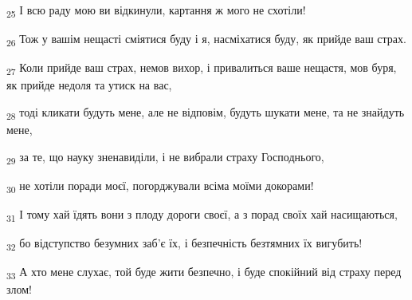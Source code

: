 \begin{tcolorbox}
\textsubscript{25} І всю раду мою ви відкинули, картання ж мого не схотіли!
\end{tcolorbox}
\begin{tcolorbox}
\textsubscript{26} Тож у вашім нещасті сміятися буду і я, насміхатися буду, як прийде ваш страх.
\end{tcolorbox}
\begin{tcolorbox}
\textsubscript{27} Коли прийде ваш страх, немов вихор, і привалиться ваше нещастя, мов буря, як прийде недоля та утиск на вас,
\end{tcolorbox}
\begin{tcolorbox}
\textsubscript{28} тоді кликати будуть мене, але не відповім, будуть шукати мене, та не знайдуть мене,
\end{tcolorbox}
\begin{tcolorbox}
\textsubscript{29} за те, що науку зненавиділи, і не вибрали страху Господнього,
\end{tcolorbox}
\begin{tcolorbox}
\textsubscript{30} не хотіли поради моєї, погорджували всіма моїми докорами!
\end{tcolorbox}
\begin{tcolorbox}
\textsubscript{31} І тому хай їдять вони з плоду дороги своєї, а з порад своїх хай насищаються,
\end{tcolorbox}
\begin{tcolorbox}
\textsubscript{32} бо відступство безумних заб'є їх, і безпечність безтямних їх вигубить!
\end{tcolorbox}
\begin{tcolorbox}
\textsubscript{33} А хто мене слухає, той буде жити безпечно, і буде спокійний від страху перед злом!
\end{tcolorbox}
